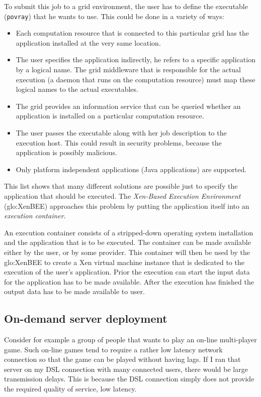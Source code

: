 To  submit this job  to a  grid environment,  the user  has to  define the
executable (\ie \texttt{povray}) that he  wants to use. This could be done
in a variety of ways:
\begin{itemize}
\item Each computation resource that  is connected to this particular grid
  has the application installed at the very same location.
\item The  user specifies the application  indirectly, \ie he  refers to a
  specific  application by  a logical  name. The  grid middleware  that is
  responsible  for the actual  execution (\eg  a daemon  that runs  on the
  computation  resource)  must  map  these  logical names  to  the  actual
  executables.
\item The grid provides an information service that can be queried whether
  an application is installed on a particular computation resource.
\item The user passes the executable along with her job description to the
  execution  host. This  could result  in security  problems,  because the
  application is possibly malicious. 
\item Only  platform independent applications (\eg  Java applications) are
  supported.
\end{itemize}

This list shows that many different solutions are possible just to specify
the application  that should  be executed.  The  \emph{Xen-Based Execution
  Environment} (\gls{glo:XenBEE})  approaches this problem  by putting the
application itself into an \emph{execution container}.

An  execution  container  consists  of a  stripped-down  operating  system
installation and  the application that  is to be executed.   The container
can  be made  available either  by the  user, or  by some  provider.  This
container  will then  be  used by  the  \gls{glo:XenBEE} to  create a  Xen
virtual machine instance that is  dedicated to the execution of the user's
application.   Prior  the execution  can  start  the  input data  for  the
application has to be made available. After the execution has finished the
output data has to be made available to user.


\subsection{On-demand server deployment}
\label{sec:demand-serv-depl}

Consider  for example  a group  of people  that wants  to play  an on-line
multi-player game. Such on-line games tend to require a rather low latency
network connection so that the game  can be played without having lags. If
I ran  that server on my  DSL connection with many  connected users, there
would be  large transmission delays.   This is because the  DSL connection
simply does not provide the required quality of service, \ie low latency.

